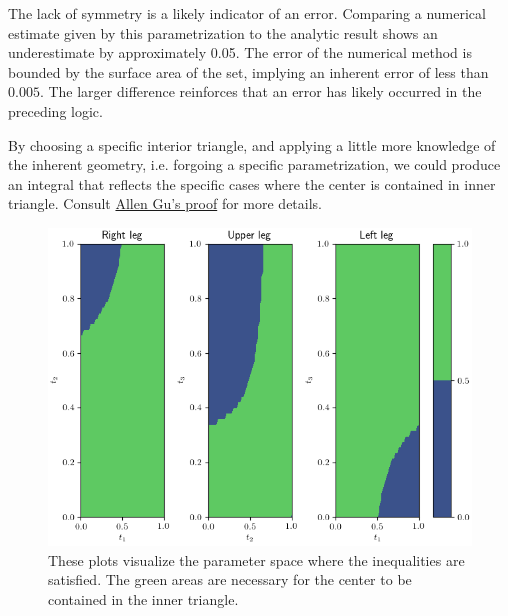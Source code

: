 \documentclass[reqno]{amsart}
\begin{document}
The lack of symmetry is a likely indicator of an error. Comparing a numerical estimate given by this parametrization to the analytic result shows an underestimate by approximately 0.05. The error of the numerical method is bounded by the surface area of the set, implying an inherent error of less than $0.005$. The larger difference reinforces that an error has likely occurred in the preceding logic. 

By choosing a specific interior triangle, and applying a little more knowledge of the inherent geometry, i.e. forgoing a specific parametrization, we could produce an integral that reflects the specific cases where the center is contained in inner triangle. Consult \href{https://puzzlingthroughmed.com/tricky-triangles/}{Allen Gu's proof} for more details. 

\begin{figure}[h]
	\centering
	\includegraphics[scale = 0.75]{InequalitySlices.png}
	\caption{These plots visualize the parameter space where the inequalities are satisfied. The green areas are necessary for the center to be contained in the inner triangle.}
	\label{plot:inequalitySlices}
\end{figure}
\end{document}
